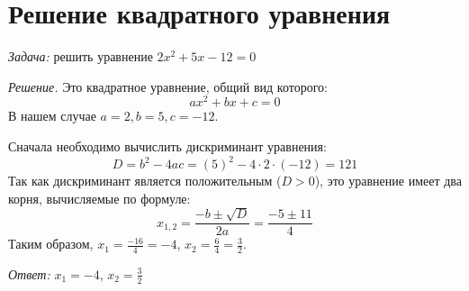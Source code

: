 \documentclass[12pt]{article}
\begin{document}
\section{Решение квадратного уравнения}

\textit{Задача:} решить уравнение $2x^2 + 5x - 12 = 0$

\textit{Решение.} Это квадратное уравнение, общий вид которого:
$$ ax^2 + bx + c = 0 $$
В нашем случае $a = 2, b = 5, c = -12$.

Сначала необходимо вычислить дискриминант уравнения:
$$ D = b^2 - 4ac = (5)^2 - 4 \cdot 2 \cdot (-12) = 121 $$
Так как дискриминант является положительным ($D > 0$), это уравнение
имеет два корня, вычисляемые по формуле:
$$ x_{1,2} = \frac{-b \pm \sqrt{D}}{2a} = \frac{-5 \pm 11}{4} $$
Таким образом, $ x_1 = \frac{-16}{4} = -4 $, $ x_2 = \frac{6}{4} = \frac{3}{2} $.

\textit{Ответ:} $ x_1 = -4$, $x_2 = \frac{3}{2} $
\end{document}
